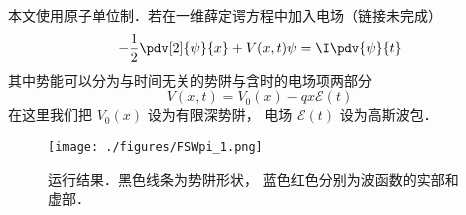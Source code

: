 
\begin{issues}
\issueDraft
\end{issues}


本文使用原子单位制．若在一维薛定谔方程中加入电场（链接未完成）
\begin{equation}
-\frac12 \pdv[2]{\psi}{x} + V(x,t)\psi = \I \pdv{\psi}{t}
\end{equation}
其中势能可以分为与时间无关的势阱与含时的电场项两部分
\begin{equation}
V(x,t) = V_0(x) - qx\mathcal E(t)
\end{equation}
在这里我们把 $V_0(x)$ 设为有限深势阱， 电场 $\mathcal E(t)$ 设为高斯波包．

\begin{figure}[ht]
\centering
\texttt{[image: ./figures/FSWpi\_1.png]}
\caption{运行结果．黑色线条为势阱形状， 蓝色红色分别为波函数的实部和虚部．} \label{FSWpi_fig1}
\end{figure}

